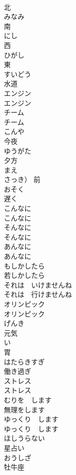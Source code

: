\documentclass[8pt]{extreport}
\begin{document}
\begin{CJK}{UTF8}{min}
\\	北	
\\	みなみ	
\\	南		
\\	にし	
\\	西		
\\	ひがし	
\\	東		
\\	すいどう	
\\	水道	
\\	エンジン	
\\	エンジン	
\\	チーム	
\\	チーム		
\\	こんや	
\\	今夜		
\\	ゆうがた	
\\	夕方		
\\	まえ	
\\	さっき）	前		
\\	おそく	
\\	遅く		
\\	こんなに	
\\	こんなに		
\\	そんなに	
\\	そんなに		
\\	あんなに	
\\	あんなに		
\\	もしかしたら	
\\	若しかしたら		
\\	それは　いけませんね	
\\	それは　行けませんね		
\\	オリンピック	
\\	オリンピック		
\\	げんき	
\\	元気		
\\	い	
\\	胃		
\\	はたらきすぎ	
\\	働き過ぎ		
\\	ストレス	
\\	ストレス		
\\	むりを　します	
\\	無理をします		
\\	ゆっくり　します	
\\	ゆっくり　します		
\\	ほしうらない	
\\	星占い		
\\	おうしざ	
\\	牡牛座		

\end{CJK}
\end{document}
